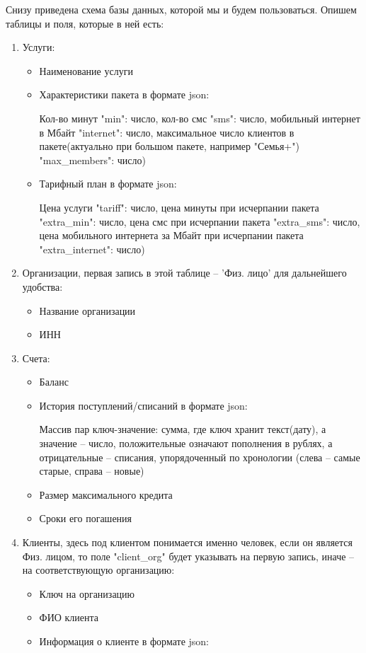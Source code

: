 \documentclass[oneside,senior,etd]{BYUPhysForDegree}
\begin{document}
Снизу приведена схема базы данных, которой мы и будем пользоваться. Опишем таблицы и поля, которые в ней есть:
\begin{enumerate}
    \item Услуги: \begin{itemize}
        \item Наименование услуги
        \item Характеристики пакета в формате json:
        
        Кол-во минут "min": число, кол-во смс "sms": число, мобильный интернет в Мбайт "internet": число, максимальное число клиентов в пакете(актуально при большом пакете, например "Семья+") "max\_members": число)
        \item Тарифный план в формате json:
        
        Цена услуги "tariff": число, цена минуты при исчерпании пакета "extra\_min": число, цена смс при исчерпании пакета "extra\_sms": число, цена мобильного интернета за Мбайт при исчерпании пакета  "extra\_internet": число)
    \end{itemize}
    \item Организации, первая запись в этой таблице -- 'Физ. лицо' для дальнейшего удобства: \begin{itemize}
        \item Название организации
        \item ИНН
    \end{itemize}

    \item Счета: \begin{itemize}
        \item Баланс
        \item История поступлений/списаний в формате json:
        
        Массив пар ключ-значение: сумма, где ключ хранит текст(дату), а значение -- число, положительные означают пополнения в рублях, а отрицательные -- списания, упорядоченный по хронологии (слева -- самые старые, справа -- новые)
        \item Размер максимального кредита
        \item Сроки его погашения
    \end{itemize}

    \item Клиенты, здесь под клиентом понимается именно человек, если он является Физ. лицом, то поле "client\_org" будет указывать на первую запись, иначе -- на соответствующую организацию: \begin{itemize}
        \item Ключ на организацию
        \item ФИО клиента
        \item Информация о клиенте в формате json:


\end{itemize}
\end{enumerate}
\end{document}
